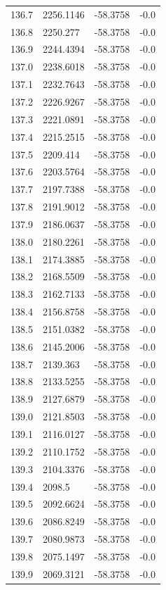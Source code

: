 \begin{table}[H]
\begin{tabular}{llll}
136.7 & 2256.1146 & -58.3758 & -0.0 \\
136.8 & 2250.277 & -58.3758 & -0.0 \\
136.9 & 2244.4394 & -58.3758 & -0.0 \\
137.0 & 2238.6018 & -58.3758 & -0.0 \\
137.1 & 2232.7643 & -58.3758 & -0.0 \\
137.2 & 2226.9267 & -58.3758 & -0.0 \\
137.3 & 2221.0891 & -58.3758 & -0.0 \\
137.4 & 2215.2515 & -58.3758 & -0.0 \\
137.5 & 2209.414 & -58.3758 & -0.0 \\
137.6 & 2203.5764 & -58.3758 & -0.0 \\
137.7 & 2197.7388 & -58.3758 & -0.0 \\
137.8 & 2191.9012 & -58.3758 & -0.0 \\
137.9 & 2186.0637 & -58.3758 & -0.0 \\
138.0 & 2180.2261 & -58.3758 & -0.0 \\
138.1 & 2174.3885 & -58.3758 & -0.0 \\
138.2 & 2168.5509 & -58.3758 & -0.0 \\
138.3 & 2162.7133 & -58.3758 & -0.0 \\
138.4 & 2156.8758 & -58.3758 & -0.0 \\
138.5 & 2151.0382 & -58.3758 & -0.0 \\
138.6 & 2145.2006 & -58.3758 & -0.0 \\
138.7 & 2139.363 & -58.3758 & -0.0 \\
138.8 & 2133.5255 & -58.3758 & -0.0 \\
138.9 & 2127.6879 & -58.3758 & -0.0 \\
139.0 & 2121.8503 & -58.3758 & -0.0 \\
139.1 & 2116.0127 & -58.3758 & -0.0 \\
139.2 & 2110.1752 & -58.3758 & -0.0 \\
139.3 & 2104.3376 & -58.3758 & -0.0 \\
139.4 & 2098.5 & -58.3758 & -0.0 \\
139.5 & 2092.6624 & -58.3758 & -0.0 \\
139.6 & 2086.8249 & -58.3758 & -0.0 \\
139.7 & 2080.9873 & -58.3758 & -0.0 \\
139.8 & 2075.1497 & -58.3758 & -0.0 \\
139.9 & 2069.3121 & -58.3758 & -0.0 \\

\end{tabular}
\end{table}
